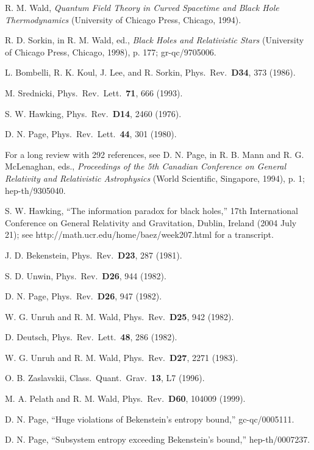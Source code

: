 \documentclass[12pt]{article} \usepackage{latexsym}
\begin{document}
\begin{thebibliography}{99}
 R. M. Wald, \emph{Quantum Field Theory in Curved
  Spacetime and Black Hole Thermodynamics} (University of Chicago
  Press, Chicago, 1994).

 R. D. Sorkin, in R. M. Wald, ed., \emph{Black Holes
  and Relativistic Stars} (University of Chicago Press, Chicago,
  1998), p. 177; gr-qc/9705006.

 L. Bombelli, R. K. Koul, J. Lee, and R. Sorkin, Phys.\
  Rev.\ {\bf D34}, 373 (1986).

 M. Srednicki, Phys.\ Rev.\ Lett.\ {\bf 71}, 666 (1993).

 S. W. Hawking,  Phys.\ Rev.\ {\bf D14}, 2460 (1976).

 D. N. Page, Phys.\ Rev.\ Lett.\ {\bf 44}, 301 (1980).

 For a long review with 292 references, see
  D. N. Page, in R. B. Mann and R. G. McLenaghan, eds., \emph{
  Proceedings of the 5th Canadian Conference on General Relativity and
  Relativistic Astrophysics} (World Scientific, Singapore, 1994),
  p. 1; hep-th/9305040.

 S. W. Hawking, ``The information paradox for black
  holes,'' 17th International Conference on General Relativity and
  Gravitation, Dublin, Ireland (2004 July 21); see
  http://math.ucr.edu/home/baez/week207.html for a transcript.

 J. D. Bekenstein, Phys.\ Rev.\ {\bf D23}, 287 (1981).

 S. D. Unwin, Phys.\ Rev.\ {\bf D26}, 944 (1982).

 D. N. Page, Phys.\ Rev.\ {\bf D26}, 947 (1982).

 W. G. Unruh and R. M. Wald, Phys.\ Rev.\ {\bf D25}, 942
  (1982).

 D. Deutsch, Phys.\ Rev.\ Lett.\ {\bf 48}, 286
  (1982).

 W. G. Unruh and R. M. Wald, Phys.\ Rev.\ {\bf D27}, 2271
  (1983).

 O. B. Zaslavskii, Class.\ Quant.\ Grav.\ {\bf 13}, L7
  (1996).

 M. A. Pelath and R. M. Wald, Phys.\ Rev.\ {\bf D60}, 104009
  (1999).

 D. N. Page, ``Huge violations of Bekenstein's
  entropy bound,'' gc-qc/0005111.

 D. N. Page, ``Subsystem entropy exceeding
  Bekenstein's bound,'' hep-th/0007237.


\end{thebibliography}
\end{document}

